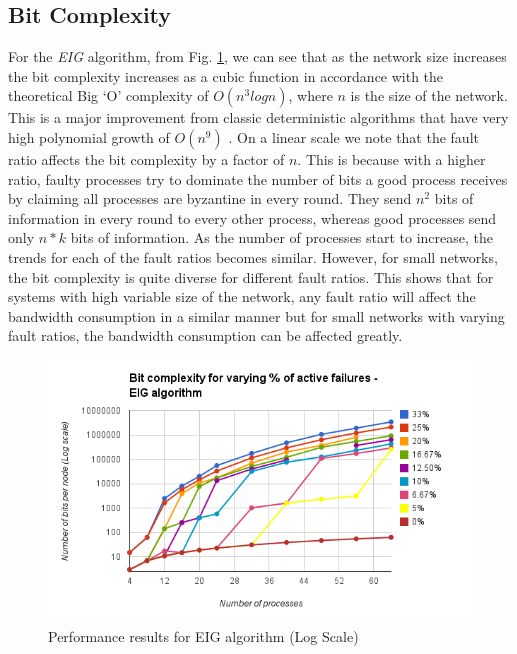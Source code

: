 \subsection{Bit Complexity} For the \textit{EIG} algorithm, from Fig.
\ref{fig:eig}, we can see that as the network size increases the bit complexity
increases as a cubic function in accordance with the theoretical Big `O'
complexity of $O(n^3 logn)$, where $n$ is the size of the network. This is
a major improvement from classic deterministic algorithms that have very high
polynomial growth of $O(n^9)$ \cite{GarayM98}. On a linear scale we note that
the fault ratio affects the bit complexity by a factor of $n$. This is because
with a higher ratio, faulty processes try to dominate the number of bits a good
process receives by claiming all processes are byzantine in every round. They
send $n^2$ bits of information in every round to every other process, whereas
good processes send only $n*k$ bits of information. As the number of processes
start to increase, the trends for each of the fault ratios becomes similar.
However, for small networks, the bit complexity is quite diverse for different
fault ratios. This shows that for systems with high variable size of the
network, any fault ratio will affect the bandwidth consumption in a similar
manner but for small networks with varying fault ratios, the bandwidth
consumption can be affected greatly.   \begin{figure}[ht] \centering
    \includegraphics[scale=0.4]{eig} 
    \caption{Performance results for EIG algorithm (Log Scale)} \label{fig:eig}
    \end{figure}

